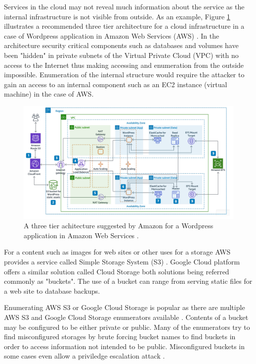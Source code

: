 Services in the cloud may not reveal much information about the service as the internal infrastructure is not visible from outside. As an example, Figure \ref{fig:cloud_structure} illustrates a recommended three tier architecture for a cloud infrastructure in a case of Wordpress application in Amazon Web Services (AWS) \cite{AWSbestpractices}. In the architecture security critical components such as databases and volumes have been "hidden" in private subnets of the Virtual Private Cloud (VPC) with no access to the Internet thus making accessing and enumeration from the outside impossible. Enumeration of the internal structure would require the attacker to gain an access to an internal component such as an EC2 instance (virtual machine) in the case of AWS.

\begin{figure}[htb]
  \begin{center}
    \includegraphics[width=1.0\textwidth]{cloud_rakenne.png}
    \caption{A three tier achitecture suggested by Amazon for a Wordpress application in Amazon Web Services \cite{AWSbestpractices}.} 
    \label{fig:cloud_structure}
  \end{center}
\end{figure}
For a content such as images for web sites or other uses for a storage AWS provides a service called Simple Storage System (S3) \cite{s3buckets}. Google Cloud platform offers a similar solution called Cloud Storage \cite{googlebuckets} both solutions being referred commonly as "buckets". The use of a bucket can range from serving static files for a web site to database backups.

Enumerating AWS S3 or Google Cloud Storage is popular as there are multiple AWS S3 and Google Cloud Storage enumerators available \cite{GCPBucket}\citep{AWSpentest}. Contents of a bucket may be configured to be either private or public. Many of the enumerators try to find misconfigured storages by brute forcing bucket names to find buckets in order to access information not intended to be public. Misconfigured buckets in some cases even allow a priviledge escalation attack \cite{GCPBucket}.

